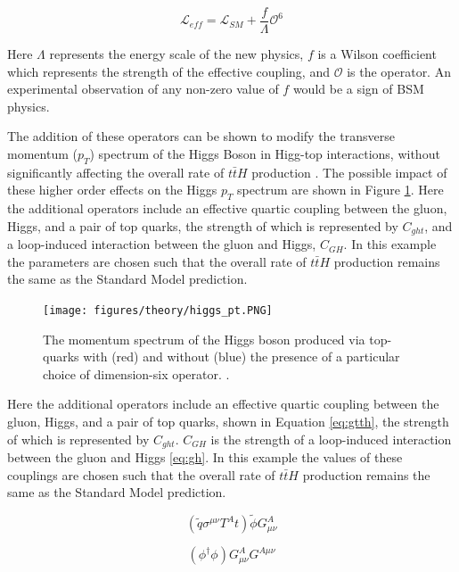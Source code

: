 \begin{equation}
\label{eq:dim6}
\mathcal{L}_{eff} = \mathcal{L}_{SM} + \frac{f}{\Lambda}\mathcal{O}^6
\end{equation}

Here $\Lambda$ represents the energy scale of the new physics, $f$ is a Wilson coefficient which represents the strength of the effective coupling, and $\mathcal{O}$ is the operator. An experimental observation of any non-zero value of $f$ would be a sign of BSM physics.

The addition of these operators can be shown to modify the transverse momentum ($p_T$) spectrum of the Higgs Boson in Higg-top interactions, without significantly affecting the overall rate of $t\bar{t}H$ production \cite{Banerjee_2014}. The possible impact of these higher order effects on the Higgs $p_T$ spectrum are shown in Figure \ref{fig:eft_pt}. Here the additional operators include an effective quartic coupling between the gluon, Higgs, and a pair of top quarks, the strength of which is represented by $C_{ght}$, and a loop-induced interaction between the gluon and Higgs, $C_{GH}$. In this example the parameters are chosen such that the overall rate of $t\bar{t}H$ production remains the same as the Standard Model prediction.

\begin{figure}[H]
\centering
   \texttt{[image: figures/theory/higgs\_pt.PNG]}
\caption{The momentum spectrum of the Higgs boson produced via top-quarks with (red) and without (blue) the presence of a particular choice of dimension-six operator.  \cite{Banerjee_2014}.}
\label{fig:eft_pt}
\end{figure}

Here the additional operators include an effective quartic coupling between the gluon, Higgs, and a pair of top quarks, shown in Equation \ref{eq:gtth}, the strength of which is represented by $C_{ght}$. $C_{GH}$ is the strength of a loop-induced interaction between the gluon and Higgs \ref{eq:gh}. In this example the values of these couplings are chosen such that the overall rate of $t\bar{t}H$ production remains the same as the Standard Model prediction.

\begin{equation}
\label{eq:gtth}
(\tilde{q}\sigma^{\mu\nu}T^At)\tilde{\phi}G^A_{\mu\nu}
\end{equation}


\begin{equation}
\label{eq:gh}
(\phi^\dagger\phi)G^A_{\mu\nu}G^{A\mu\nu}
\end{equation}


